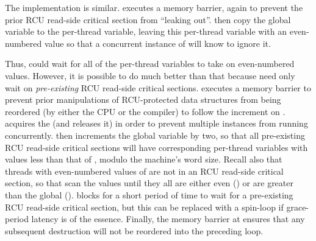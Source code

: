 \begin{fcvref}
The  implementation is similar.
 executes a memory barrier, again to prevent the prior RCU
read-side critical section from ``leaking out''.
 then copy the  global variable to the
 per-thread variable, leaving this per-thread
variable with an even-numbered value so that a concurrent instance
of  will know to ignore it.
\end{fcvref}

\QuickQuizEnd

\begin{fcvref}
Thus,  could wait for all of the per-thread
 variables to take on even-numbered values.
However, it is possible to do much better than that because
 need only wait on \emph{pre-existing}
RCU read-side critical sections.
 executes a memory barrier to prevent prior manipulations
of RCU-protected data structures from being reordered (by either
the CPU or the compiler) to follow the increment on
.
 acquires the 
(and  releases it)
in order to prevent multiple
 instances from running concurrently.
 then increments the global  variable by
two, so that all pre-existing RCU read-side critical sections will
have corresponding per-thread  variables with
values less than that of , modulo the machine's
word size.
Recall also that threads with even-numbered values of 
are not in an RCU read-side critical section,
so that 
scan the  values until they
all are either even () or are greater than the global
 ().
 blocks for a short period of time to wait for a
pre-existing RCU read-side critical section, but this can be replaced with
a spin-loop if grace-period latency is of the essence.
Finally, the memory barrier at  ensures that any subsequent
destruction will not be reordered into the preceding loop.
\end{fcvref}

